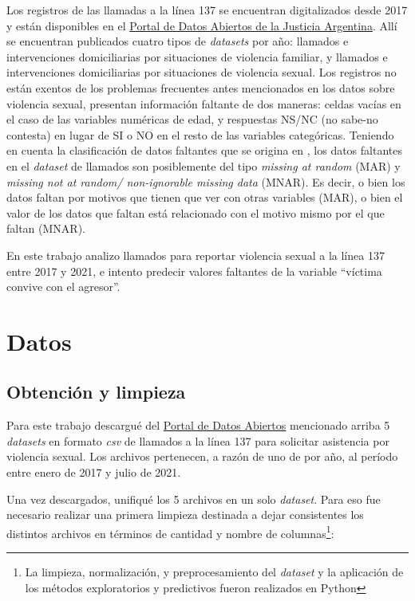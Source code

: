 \documentclass[10 pt]{article}
\begin{document}
Los registros de las llamadas a la línea 137 se encuentran digitalizados desde 2017 y están disponibles en el \href{http://datos.jus.gob.ar/}{Portal de Datos Abiertos de la Justicia Argentina}. Allí se encuentran publicados cuatro tipos de \textit{datasets} por año: llamados e intervenciones domiciliarias por situaciones de violencia familiar, y llamados e intervenciones domiciliarias por situaciones de violencia sexual.
Los registros no están exentos de los problemas frecuentes antes mencionados en los datos sobre violencia sexual, presentan información faltante de dos maneras: celdas vacías en el caso de las variables numéricas de edad, y respuestas NS/NC (no sabe-no contesta) en lugar de SI o NO en el resto de las variables categóricas. Teniendo en cuenta la clasificación de datos faltantes que se origina en \citet{rubin1976inference}, los datos faltantes en el \textit{dataset} de llamados son posiblemente del tipo \textit{missing at random} (MAR) y \textit{missing not at random/ non-ignorable missing data} (MNAR). Es decir, o bien los datos faltan por motivos que tienen que ver con otras variables (MAR), o bien el valor de los datos que faltan está relacionado con el motivo mismo por el que faltan (MNAR).

En este trabajo analizo llamados para reportar violencia sexual a la línea 137 entre 2017 y 2021, e intento predecir valores faltantes de la variable “víctima convive con el agresor”. 



\section*{Datos}\label{datos}

\subsection*{Obtención y limpieza}\label{limpieza}
Para este trabajo descargué del \href{http://datos.jus.gob.ar/}{Portal de Datos Abiertos} mencionado arriba 5 \textit{datasets} en formato \textit{csv} de llamados a la línea 137 para solicitar asistencia por violencia sexual. Los archivos pertenecen, a razón de uno de por año, al período entre enero de 2017 y julio de 2021. 

Una vez descargados, unifiqué los 5 archivos en un solo \textit{dataset}. Para eso fue necesario realizar una primera limpieza destinada a dejar consistentes los distintos archivos en términos de cantidad y nombre de columnas\footnote{La limpieza, normalización, y preprocesamiento del \textit{dataset} y la aplicación de los métodos exploratorios y predictivos fueron realizados en Python}:
\end{document}
